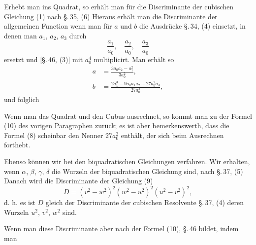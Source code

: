 
Erhebt man ins Quadrat, so erhält man für die Discriminante der cubischen Gleichung (1) nach \S.\,35, (6)
Hieraus erhält man die Discriminante der allgemeinen Function
wenn man für $a$ und $b$ die Ausdrücke \S.\,34, (4) einsetzt, in denen man $a_1$, $a_2$, $a_3$ durch
\[
\frac{a_1}{a_0}, \quad \frac{a_2}{a_0}, \quad \frac{a_3}{a_0}
\]
ersetzt und [\S.\,46, (3)] mit $a_0^4$ multiplicirt. Man erhält so
\[
\begin{aligned}
a &= \frac{3 a_0 a_2 - a_1^2}{3 a_0^2},\\
b &= \frac{2 a_1^3 - 9 a_0 a_1 a_2 + 27 a_0^2 a_3}{27 a_0^3},
\end{aligned}
\]
und folglich

Wenn man das Quadrat und den Cubus ausrechnet, so kommt man zu der Formel (10) des vorigen Paragraphen zurück; es ist aber bemerkenswerth, dass die Formel (8) scheinbar den Nenner $27 a_0^2$ enthält, der sich beim Ausrechnen forthebt.

Ebenso können wir bei den biquadratischen Gleichungen verfahren. Wir erhalten, wenn $\alpha$, $\beta$, $\gamma$, $\delta$ die Wurzeln der biquadratischen Gleichung
sind, nach \S.\,37, (5)
Danach wird die Discriminante der Gleichung (9)
\[
D = (v^2 - w^2)^2 (w^2 - u^2)^2 (u^2 - v^2)^2,
\]
d. h. es ist $D$ gleich der Discriminante der cubischen Resolvente \S.\,37, (4)
deren Wurzeln $u^2$, $v^2$, $w^2$ sind.

Wenn man diese Discriminante aber nach der Formel (10), \S.\,46 bildet, indem man

